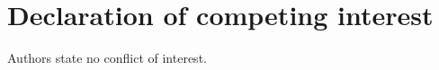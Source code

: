 \documentclass[preprint,12pt]{elsarticle}
\begin{document}



\section*{Declaration of competing interest}
Authors state no conflict of interest.









\newpage





\clearpage
\end{document}
